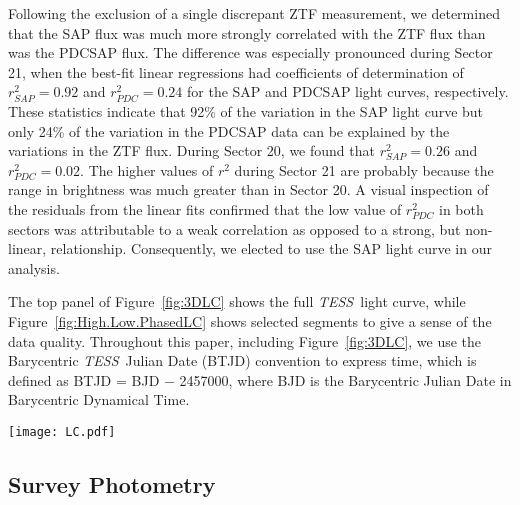 \documentclass[twocolumn]{aastex63}
\newcommand{\doubleorbit}{2$\Omega$}
\newcommand{\TESS}{\textit{TESS}}
\begin{document}
Following the exclusion of a single discrepant ZTF measurement, we determined that the SAP flux was much more strongly correlated with the ZTF flux than was the PDCSAP flux. The difference was especially pronounced during Sector 21, when the best-fit linear regressions had coefficients of determination of $r^{2}_{SAP} = 0.92$ and $r^{2}_{PDC} = 0.24$ for the SAP and PDCSAP light curves, respectively. These statistics indicate that 92\% of the variation in the SAP light curve but only 24\% of the variation in the PDCSAP data can be explained by the variations in the ZTF flux. During Sector 20, we found that $r^{2}_{SAP} = 0.26$ and $r^{2}_{PDC} = 0.02$. The higher values of $r^2$ during Sector 21 are probably because the range in brightness was much greater than in Sector 20. A visual inspection of the residuals from the linear fits confirmed that the low value of $r^{2}_{PDC}$ in both sectors was attributable to a weak correlation as opposed to a strong, but non-linear, relationship. Consequently, we elected to use the SAP light curve in our analysis. 

The top panel of Figure~\ref{fig:3DLC} shows the full \TESS\ light curve, while Figure~\ref{fig:High.Low.PhasedLC} shows selected segments to give a sense of the data quality. Throughout this paper, including Figure~\ref{fig:3DLC}, we use the Barycentric \TESS\ Julian Date (BTJD) convention to express time, which is defined as BTJD = BJD $-$ 2457000, where BJD is the Barycentric Julian Date in Barycentric Dynamical Time.

\begin{figure*}
\centering
\texttt{[image: LC.pdf]}
\caption{{\bf Top Panel:} \TESS\ light curve of YY Dra, showing the SAP flux from the mission's pipeline. The deep low state described in the text is apparent at BTJD=1888. {\bf Bottom Three Panels:} Slices of YY Dra's two-dimensional power spectrum near frequencies of interest, following the subtraction of a smoothed version of the light curve to suppress red noise. All periodic variation ceases during the deep low state except for the \doubleorbit\ signal, which we attribute to ellipsoidal variations by the donor star. The same intensity color map is used for all three panels.}
\label{fig:3DLC}
\end{figure*}


\subsection{Survey Photometry}
\end{document}
